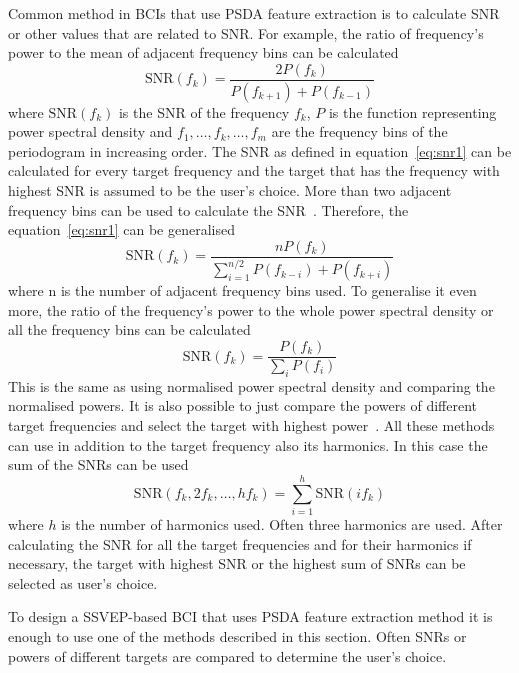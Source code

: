 Common method in \glspl{BCI} that use \gls{PSDA} \gls{feature extraction} is to calculate \gls{SNR} or other values that are related to \gls{SNR}. For example, the ratio of frequency's power to the mean of adjacent frequency bins can be calculated~\cite{psda_snr1}
\begin{equation}
	\label{eq:snr1}
	\mbox{SNR}(f_k) = \frac{2P(f_k)}{P(f_{k+1})+P(f_{k-1})}
\end{equation}
where $\mbox{SNR}(f_k)$ is the \gls{SNR} of the frequency $f_k$, $P$ is the function representing \gls{power spectral density} and $f_1,\dots, f_k,\dots,f_m$ are the \glspl{frequency bin} of the \gls{periodogram} in increasing order. The \gls{SNR} as defined in equation~\ref{eq:snr1} can be calculated for every \gls{target} frequency and the \gls{target} that has the frequency with highest \gls{SNR} is assumed to be the user's choice. More than two adjacent frequency bins can be used to calculate the \gls{SNR}~\cite{psda_snr2}. Therefore, the equation~\ref{eq:snr1} can be generalised
\begin{equation}
	\mbox{SNR}(f_k) = \frac{nP(f_k)}{\sum_{i=1}^{n/2}P(f_{k-i})+P(f_{k+i})}
\end{equation}
where n is the number of adjacent frequency bins used. To generalise it even more, the ratio of the frequency's power to the whole \gls{power spectral density} or all the \glspl{frequency bin} can be calculated
\begin{equation}
	\mbox{SNR}(f_k) = \frac{P(f_k)}{\sum_i P(f_i)}
\end{equation}
This is the same as using normalised \gls{power spectral density} and comparing the normalised powers. It is also possible to just compare the powers of different \gls{target} frequencies and select the \gls{target} with highest power~\cite{cca_psda}. All these methods can use in addition to the \gls{target} frequency also its \glspl{harmonic}. In this case the sum of the \glspl{SNR} can be used
\begin{equation}
	\mbox{SNR}(f_k, 2f_k, \dots, hf_k)=\sum_{i=1}^{h}\mbox{SNR}(if_k)
\end{equation}
where $h$ is the number of \glspl{harmonic} used. Often three \glspl{harmonic} are used. After calculating the \gls{SNR} for all the \gls{target} frequencies and for their \glspl{harmonic} if necessary, the \gls{target} with highest \gls{SNR} or the highest sum of \glspl{SNR} can be selected as user's choice.

To design a \gls{SSVEP}-based \gls{BCI} that uses \gls{PSDA} \gls{feature extraction} method it is enough to use one of the methods described in this section. Often \glspl{SNR} or powers of different \glspl{target} are compared to determine the user's choice.

